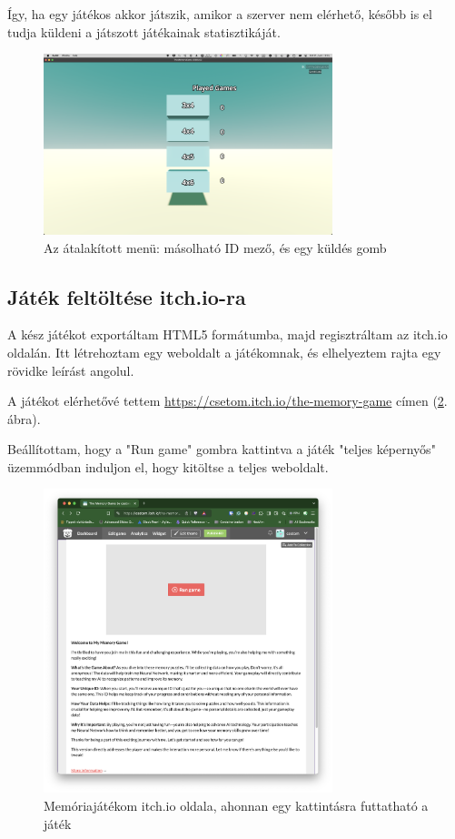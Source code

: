 Így, ha egy játékos akkor játszik, amikor a szerver nem elérhető, később is el tudja küldeni a játszott játékainak statisztikáját.\begin{figure}[h]
    \centering
    \includegraphics[width=0.75\textwidth]{img/menu_remake.png}
    \caption{Az átalakított menü: másolható ID mező, és egy küldés gomb}
    \label{img:menu_remake}  
\end{figure}

\subsection{Játék feltöltése itch.io-ra}

A kész játékot exportáltam HTML5 formátumba, majd regisztráltam az itch.io oldalán.
Itt létrehoztam egy weboldalt a játékomnak, és elhelyeztem rajta egy rövidke leírást angolul.

A játékot elérhetővé tettem \url{https://csetom.itch.io/the-memory-game} címen (\ref{img:itch.io}. ábra). 

Beállítottam, hogy a "Run game" gombra kattintva a játék "teljes képernyős" üzemmódban induljon el, hogy kitöltse a teljes weboldalt. 

\begin{figure}[h]
  \centering
  \includegraphics[width=0.75\textwidth]{img/Itch.io.png}
  \caption{Memóriajátékom itch.io oldala, ahonnan egy kattintásra futtatható a játék}
  \label{img:itch.io}  
\end{figure}


